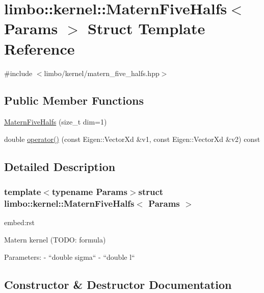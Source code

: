 \hypertarget{structlimbo_1_1kernel_1_1_matern_five_halfs}{}\section{limbo\+:\+:kernel\+:\+:Matern\+Five\+Halfs$<$ Params $>$ Struct Template Reference}
\label{structlimbo_1_1kernel_1_1_matern_five_halfs}


{\ttfamily \#include $<$limbo/kernel/matern\+\_\+five\+\_\+halfs.\+hpp$>$}

\subsection*{Public Member Functions}
\begin{DoxyCompactItemize}
\item 
\hyperlink{structlimbo_1_1kernel_1_1_matern_five_halfs_a6b7d9003e76fb0284e209b3b5d9527ee}{Matern\+Five\+Halfs} (size\+\_\+t dim=1)
\item 
double \hyperlink{structlimbo_1_1kernel_1_1_matern_five_halfs_a070ed97b62698e9c9d10f606254954e7}{operator()} (const Eigen\+::\+Vector\+Xd \&v1, const Eigen\+::\+Vector\+Xd \&v2) const 
\end{DoxyCompactItemize}


\subsection{Detailed Description}
\subsubsection*{template$<$typename Params$>$struct limbo\+::kernel\+::\+Matern\+Five\+Halfs$<$ Params $>$}

\begin{DoxyVerb}embed:rst

Matern kernel (TODO: formula)

Parameters:
  - ``double sigma``
  - ``double l``\end{DoxyVerb}
 

\subsection{Constructor \& Destructor Documentation}
\hypertarget{structlimbo_1_1kernel_1_1_matern_five_halfs_a6b7d9003e76fb0284e209b3b5d9527ee}{}
